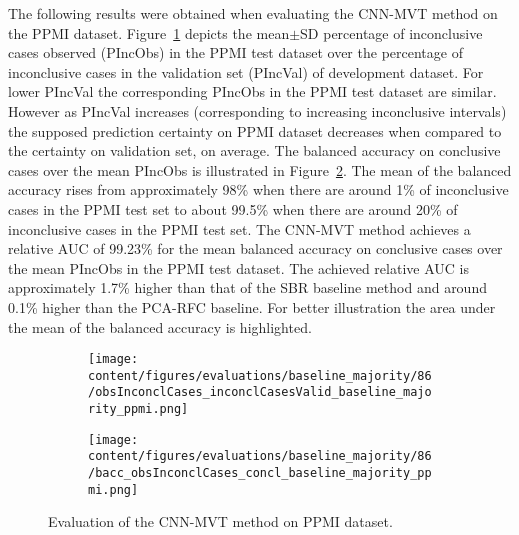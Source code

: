 The following results were obtained when evaluating the CNN-MVT method on the PPMI dataset.
Figure~\ref{fig:obsInconclCases_inconclCasesValid_baseline_majority_ppmi} depicts the
mean$\pm$SD percentage of inconclusive cases observed (PIncObs) in the PPMI test dataset 
over the percentage of inconclusive cases in the validation set (PIncVal) of development dataset.
For lower PIncVal the corresponding PIncObs in the PPMI test dataset are similar.
However as PIncVal increases (corresponding to increasing inconclusive intervals) 
the supposed prediction certainty on PPMI dataset decreases when compared to the certainty on validation set, on average.
The balanced accuracy on conclusive cases over the mean PIncObs is illustrated 
in Figure~\ref{fig:bacc_obsInconclCases_concl_baseline_majority_ppmi}.
The mean of the balanced accuracy rises from approximately 98\% 
when there are around 1\% of inconclusive cases in the PPMI test set to about 99.5\% 
when there are around 20\% of inconclusive cases in the PPMI test set.
The CNN-MVT method achieves a relative AUC of 99.23\% for the mean balanced accuracy on conclusive cases 
over the mean PIncObs in the PPMI test dataset.
The achieved relative AUC is approximately 1.7\% higher than that of the SBR baseline method 
and around 0.1\% higher than the PCA-RFC baseline.
For better illustration the area under the mean of the balanced accuracy is highlighted.


\begin{figure}[ht]
  \begin{subfigure}{0.9\textwidth}
    \centering
    \texttt{[image: content/figures/evaluations/baseline\_majority/86/obsInconclCases\_inconclCasesValid\_baseline\_majority\_ppmi.png]}
    \label{fig:obsInconclCases_inconclCasesValid_baseline_majority_ppmi}
  \end{subfigure}
  \hfill
  \begin{subfigure}{0.9\textwidth}
    \centering
    \texttt{[image: content/figures/evaluations/baseline\_majority/86/bacc\_obsInconclCases\_concl\_baseline\_majority\_ppmi.png]}
    \label{fig:bacc_obsInconclCases_concl_baseline_majority_ppmi}
  \end{subfigure}
  \caption{Evaluation of the CNN-MVT method on PPMI dataset.}
  \label{fig:perf_results_mvt_ppmi}
\end{figure}


